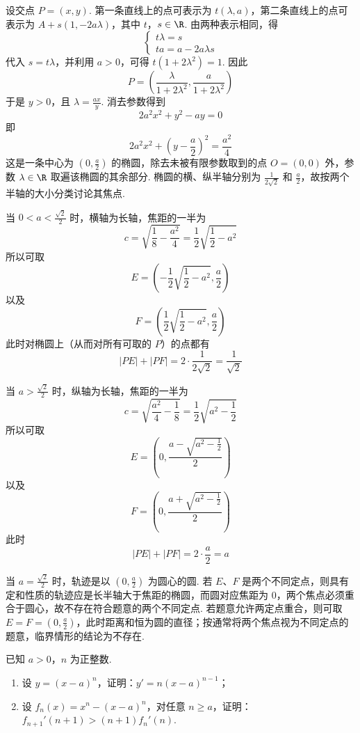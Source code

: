 \begin{solution}
设交点 \(P=(x,y)\). 第一条直线上的点可表示为 \(t(\lambda,a)\)，第二条直线上的点可表示为 \(A+s(1,-2a\lambda)\)，其中 \(t\)，\(s\in\R\). 由两种表示相同，得
\[
\begin{cases}
t\lambda=s\\
ta=a-2a\lambda s
\end{cases}
\]
代入 \(s=t\lambda\)，并利用 \(a>0\)，可得 \(t(1+2\lambda^{2})=1\). 因此
\[
P=\left(\frac{\lambda}{1+2\lambda^{2}},\frac{a}{1+2\lambda^{2}}\right)
\]
于是 \(y>0\)，且 \(\lambda=\frac{ax}{y}\). 消去参数得到
\[
2a^{2}x^{2}+y^{2}-ay=0
\]
即
\[
2a^{2}x^{2}+\left(y-\frac a2\right)^{2}=\frac{a^{2}}{4}
\]
这是一条中心为 \(\left(0,\frac a2\right)\) 的椭圆，除去未被有限参数取到的点 \(O=(0,0)\) 外，参数 \(\lambda\in\R\) 取遍该椭圆的其余部分. 椭圆的横、纵半轴分别为 \(\frac{1}{2\sqrt2}\) 和 \(\frac a2\)，故按两个半轴的大小分类讨论其焦点.

当 \(0<a<\frac{\sqrt2}{2}\) 时，横轴为长轴，焦距的一半为
\[
c=\sqrt{\frac18-\frac{a^{2}}4}=\frac12\sqrt{\frac12-a^{2}}
\]
所以可取
\[
E=\left(-\frac12\sqrt{\frac12-a^{2}},\frac a2\right)
\]
以及
\[
F=\left(\frac12\sqrt{\frac12-a^{2}},\frac a2\right)
\]
此时对椭圆上（从而对所有可取的 \(P\)）的点都有
\[
|PE|+|PF|=2\cdot\frac{1}{2\sqrt2}=\frac{1}{\sqrt2}
\]

当 \(a>\frac{\sqrt2}{2}\) 时，纵轴为长轴，焦距的一半为
\[
c=\sqrt{\frac{a^{2}}4-\frac18}=\frac12\sqrt{a^{2}-\frac12}
\]
所以可取
\[
E=\left(0,\frac{a-\sqrt{a^{2}-\frac12}}2\right)
\]
以及
\[
F=\left(0,\frac{a+\sqrt{a^{2}-\frac12}}2\right)
\]
此时
\[
|PE|+|PF|=2\cdot\frac a2=a
\]

当 \(a=\frac{\sqrt2}{2}\) 时，轨迹是以 \(\left(0,\frac a2\right)\) 为圆心的圆. 若 \(E\)、\(F\) 是两个不同定点，则具有定和性质的轨迹应是长半轴大于焦距的椭圆，而圆对应焦距为 \(0\)，两个焦点必须重合于圆心，故不存在符合题意的两个不同定点. 若题意允许两定点重合，则可取 \(E=F=\left(0,\frac a2\right)\)，此时距离和恒为圆的直径；按通常将两个焦点视为不同定点的题意，临界情形的结论为不存在.
\end{solution}

\begin{problem}
已知 \(a > 0\)，\(n\) 为正整数.

\begin{enumerate}
\item 设 \( y = (x - a)^n \)，证明：\( y' = n(x - a)^{n-1} \)；
\item 设 \( f_{n}(x) = x^{n} - (x - a)^{n} \)，对任意 \( n \geqslant a \)，证明：\( f_{n+1}'(n+1) > (n+1)f_{n}'(n) \).
\end{enumerate}
\end{problem}

